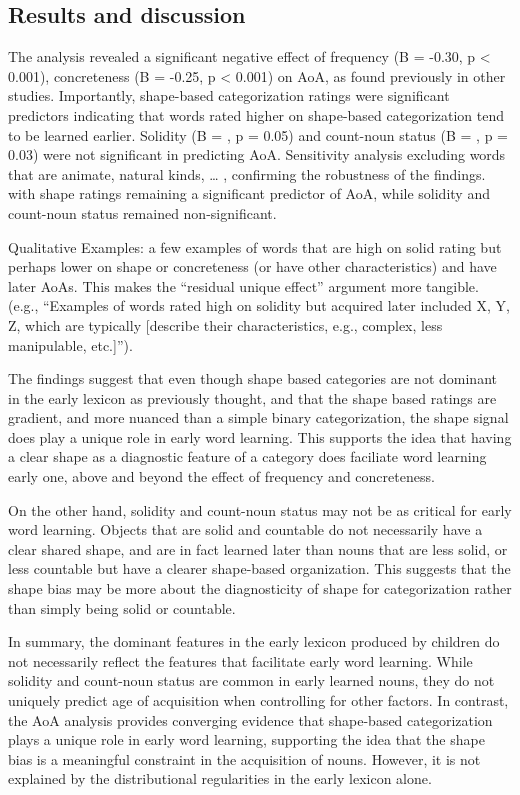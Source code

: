 \documentclass[
  american,
  man,floatsintext]{apa6}
\begin{document}
\subsection{Results and discussion}\label{results-and-discussion}

The analysis revealed a significant negative effect of frequency (B = -0.30, p \textless{} 0.001), concreteness (B = -0.25, p \textless{} 0.001) on AoA, as found previously in other studies. Importantly, shape-based categorization ratings were significant predictors indicating that words rated higher on shape-based categorization tend to be learned earlier. Solidity (B = , p = 0.05) and count-noun status (B = , p = 0.03) were not significant in predicting AoA. Sensitivity analysis excluding words that are animate, natural kinds, \ldots{} , confirming the robustness of the findings. with shape ratings remaining a significant predictor of AoA, while solidity and count-noun status remained non-significant.

Qualitative Examples: a few examples of words that are high on solid rating but perhaps lower on shape or concreteness (or have other characteristics) and have later AoAs. This makes the ``residual unique effect'' argument more tangible. (e.g., ``Examples of words rated high on solidity but acquired later included X, Y, Z, which are typically {[}describe their characteristics, e.g., complex, less manipulable, etc.{]}'').

The findings suggest that even though shape based categories are not dominant in the early lexicon as previously thought, and that the shape based ratings are gradient, and more nuanced than a simple binary categorization, the shape signal does play a unique role in early word learning. This supports the idea that having a clear shape as a diagnostic feature of a category does faciliate word learning early one, above and beyond the effect of frequency and concreteness.

On the other hand, solidity and count-noun status may not be as critical for early word learning. Objects that are solid and countable do not necessarily have a clear shared shape, and are in fact learned later than nouns that are less solid, or less countable but have a clearer shape-based organization. This suggests that the shape bias may be more about the diagnosticity of shape for categorization rather than simply being solid or countable.

In summary, the dominant features in the early lexicon produced by children do not necessarily reflect the features that facilitate early word learning. While solidity and count-noun status are common in early learned nouns, they do not uniquely predict age of acquisition when controlling for other factors. In contrast, the AoA analysis provides converging evidence that shape-based categorization plays a unique role in early word learning, supporting the idea that the shape bias is a meaningful constraint in the acquisition of nouns. However, it is not explained by the distributional regularities in the early lexicon alone.
\end{document}
